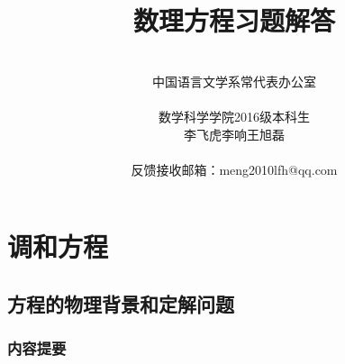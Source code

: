 \documentclass[12pt, a4paper]{ctexart}
\title{\heiti{} 数理方程习题解答}
\author{\\中国语言文学系常代表办公室\\ \\
数学科学学院2016级本科生\\ 
李飞虎\quad 李响\quad 王旭磊\\ \\
反馈接收邮箱：meng2010lfh@qq.com}
\begin{document}
	

    
    \maketitle
    \thispagestyle{empty}
	\newpage
	\tableofcontents
	\newpage
    \setcounter{page}{1}
	\section{调和方程}
    \subsection{方程的物理背景和定解问题}
    \subsubsection{内容提要}
    
\end{document}
